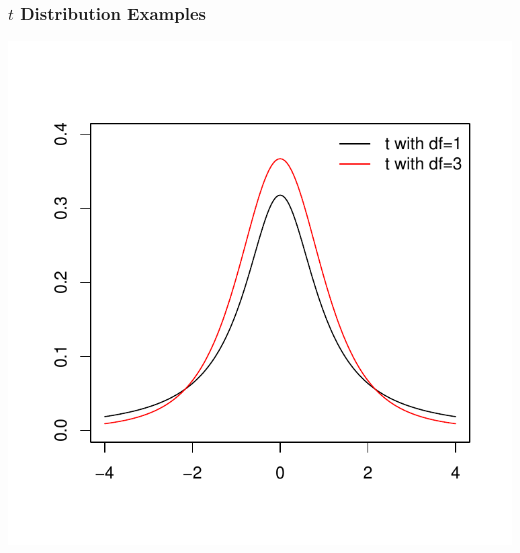 \documentclass[slides]{beamer}
\begin{document}
\begin{frame}
\frametitle{$t$ Distribution Examples}
\begin{center}
\includegraphics{lec16-002}
\end{center}
\end{frame}
\end{document}
